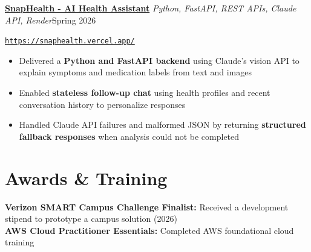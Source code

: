 \documentclass[letterpaper,11pt]{article}
\newcommand{\resumeBody}{\fontsize{10.5}{12}\selectfont}
\newcommand{\resumeTitle}{\fontsize{11}{12.5}\selectfont}
\newcommand{\resumeProjectHeading}[4]{%
  \vspace{2.5pt}%
  {\resumeTitle\textbf{#1}\enspace\textbar\enspace
   {\resumeBody\textit{#2}}\hfill{\resumeBody #3}\par}
  {\resumeBody\href{#4}{\nolinkurl{#4}}\par}
}
\newcommand{\resumeItemListStart}{%
  \begin{itemize}[leftmargin=0.14in,label=\textbullet,
    labelsep=0.05in,itemsep=1.0pt,topsep=2pt,parsep=0pt,partopsep=0pt]
  \resumeBody
}
\newcommand{\resumeItem}[1]{\item #1}
\newcommand{\resumeItemListEnd}{\end{itemize}}
\begin{document}
\resumeProjectHeading
  {\href{https://github.com/RTailor2301/SnapHealth}{SnapHealth - AI Health Assistant}}
  {Python, FastAPI, REST APIs, Claude API, Render}
  {Spring 2026}
  {https://snaphealth.vercel.app/}
\resumeItemListStart
  \resumeItem{Delivered a \textbf{Python and FastAPI backend} using Claude's vision API to explain symptoms and medication labels from text and images}
  \resumeItem{Enabled \textbf{stateless follow-up chat} using health profiles and recent conversation history to personalize responses}
  \resumeItem{Handled Claude API failures and malformed JSON by returning \textbf{structured fallback responses} when analysis could not be completed}
\resumeItemListEnd

\section{Awards \& Training}
{\resumeBody
\textbf{Verizon SMART Campus Challenge Finalist:} Received a development stipend to prototype a campus solution (2026)\\[2pt]
\textbf{AWS Cloud Practitioner Essentials:} Completed AWS foundational cloud training
\par}
\end{document}
